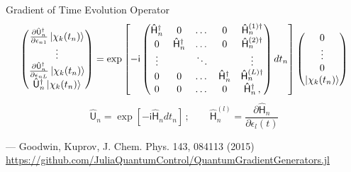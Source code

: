 \documentclass[compress, aspectratio=169,usepdftitle=false]{beamer}
\newcommand{\Op}[1]{\ensuremath{\mathsf{\hat{#1}}}}
\newcommand{\ii}{\mathsf{i}}
\begin{document}
\begin{frame}{Gradient of Time Evolution Operator}
    \begin{equation*}%
      \begin{pmatrix}
        \frac{\partial \Op{U}^{\dagger}_n}{\partial \epsilon_{n1}} \ket{\chi_k(t_{n})} \\
          \vdots\\
          \frac{\partial \Op{U}^{\dagger}_n}{\partial \epsilon_{nL}} \ket{\chi_k(t_{n})} \\
          \Op{U}^{\dagger}_n \ket{\chi_k(t_{n})}
        \end{pmatrix}
      = \exp \left[-\ii \begin{pmatrix}
        \Op{H}^\dagger_n & 0 & \dots & 0 &\Op{H}_n^{(1)\dagger} \\
        0 & \Op{H}^\dagger_n & \dots & 0 & \Op{H}_n^{(2)\dagger} \\
        \vdots & & \ddots & & \vdots \\
        0 & 0 & \dots & \Op{H}^\dagger_n & \Op{H}_n^{(L)\dagger} \\
        0 & 0 & \dots & 0 & \Op{H}^\dagger_n\,,
      \end{pmatrix} dt_n\right]
      \begin{pmatrix} 0 \\ \vdots \\ 0 \\ \ket{\chi_k(t_n)} \end{pmatrix}
    \end{equation*}
    \vspace{5mm}
    \begin{equation*}
      \Op{U}_n = \exp[-\ii \Op{H}_n dt_n]\,;
      \qquad
      \Op{H}_n^{(l)} = \frac{\partial \Op{H}_n}{\partial \epsilon_l(t)}
    \end{equation*}
    \par
    \vspace{5mm}
    \hfill \footnotesize{--- Goodwin, Kuprov, J. Chem. Phys. 143, 084113 (2015)}\\
    \vspace{3mm}
    \hfill \footnotesize{\url{https://github.com/JuliaQuantumControl/QuantumGradientGenerators.jl}}
\end{frame}
\end{document}
